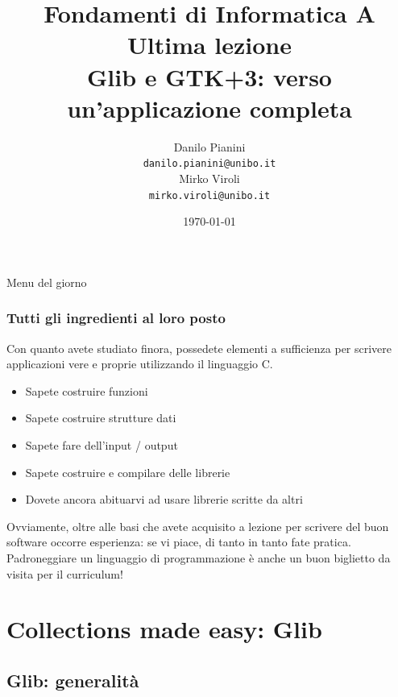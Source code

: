 \documentclass{beamer}
\begin{document}
\title[Lab1 - FV]{Fondamenti di Informatica A \\ Ultima lezione \\ Glib e GTK+3: verso un'applicazione completa}
\author[Danilo Pianini]{Danilo Pianini\\\texttt{danilo.pianini@unibo.it} \\ \vspace{3pt} Mirko Viroli\\\texttt{mirko.viroli@unibo.it} }
\date[\today]{\today}

\frame{\titlepage} 
\begin{frame}{Menu del giorno}
\tableofcontents
\end{frame}


\begin{frame}
\frametitle{Tutti gli ingredienti al loro posto}
Con quanto avete studiato finora, possedete elementi a sufficienza per scrivere applicazioni vere e proprie utilizzando il linguaggio C.
\begin{itemize}
 \item Sapete costruire funzioni
 \item Sapete costruire strutture dati
 \item Sapete fare dell'input / output
 \item Sapete costruire e compilare delle librerie
 \item Dovete ancora abituarvi ad usare librerie scritte da altri
\end{itemize}
Ovviamente, oltre alle basi che avete acquisito a lezione per scrivere del buon software occorre esperienza: se vi piace, di tanto in tanto fate pratica. Padroneggiare un linguaggio di programmazione è anche un buon biglietto da visita per il curriculum!
\end{frame}

\section{Collections made easy: Glib}

\subsection{Glib: generalità}
\end{document}
